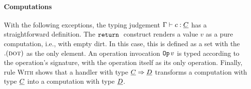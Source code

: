 \documentclass[master=cws,masteroption=ai, english]{kulemt}
\begin{document}
\paragraph{Computations}

With the following exceptions, the typing judgement \(\Gamma \vdash c : \underline{C}\)
has a straightforward definition. The \(\mathtt{return}\;\) construct renders a value
\(v\) as a pure computation, i.e., with empty dirt. In this case, this
is defined as a set with the \(. (\textsc{dot})\) as the only element. An
operation invocation \(\mathtt{Op}\,v\) is typed according to the operation's
signature, with the operation itself as its only operation. Finally,
rule \textsc{With} shows that a handler with type \(\underline{C} \Rightarrow \underline{D}\)
transforms a computation with type \(\underline{C}\) into a computation with type
\(\underline{D}\).

\begin{figure}[h]
\begin{center}
\end{center}
\end{figure}
\end{document}

